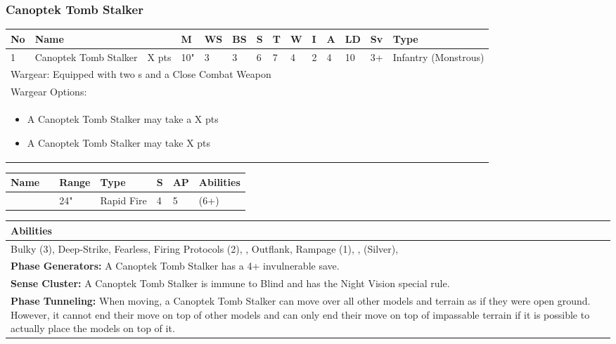 \newpage
\subsubsection{Canoptek Tomb Stalker}

\noindent
\begin{tabular}{||m{10pt} m{115pt} m{30pt} m{11pt} m{11pt} m{11pt} m{11pt} m{11pt} m{11pt} m{11pt} m{11pt} m{11pt} m{11pt} m{105pt}||}
	\hline
	No & Name & & M & WS & BS & S & T & W & I & A & LD & Sv & Type \\
	\hline
	1 & Canoptek Tomb Stalker & X pts & 10" & 3 & 3 & 6 & 7 & 4 & 2 & 4 & 10 & 3+ & Infantry (Monstrous)\\
	\hline
	\hline
	\multicolumn{14}{||Z{532 pt}||}{Wargear: Equipped with two \quickref{Gauss Flayer}s and a Close Combat Weapon}\\
	\multicolumn{14}{||Z{532 pt}||}{Wargear Options:} \\	\multicolumn{14}{||Z{532 pt}||}{\begin{itemize}
			\item A Canoptek Tomb Stalker may take a \quickref{Gloom Prism} \hrulefill X pts
			\item A Canoptek Tomb Stalker may take \quickref{Sepulchral Scarabs} \hrulefill X pts
	\end{itemize}} \\
	\hline
\end{tabular}

\noindent
\begin{tabular}{||m{110pt} m{30pt} m{31pt} m{55pt} m{12pt} m{12pt} m{210pt}||}
	\hline
	Name & & Range & Type & S & AP & Abilities \\
	\hline
	\quickref{Gauss Flayer} & & 24" & Rapid Fire & 4 & 5 & \quickref{Gauss} (6+) \\
	\hline
\end{tabular}

\noindent
\begin{tabular}{||m{532pt}||}
	\hline
	Abilities \\
	\hline
	Bulky (3), Deep-Strike, Fearless, Firing Protocols (2), \quickref{Living Metal}, Outflank, Rampage (1), \quickref{Reanimation Protocols}, \quickref{Soulless Hordes} (Silver), \quickref{Tomb Guardians} \\
	\textbf{Phase Generators:} A Canoptek Tomb Stalker has a 4+ invulnerable save. \\
	\textbf{Sense Cluster:} A Canoptek Tomb Stalker is immune to Blind and has the Night Vision special rule. \\
	\textbf{Phase Tunneling:} When moving, a Canoptek Tomb Stalker can move over all other models and terrain as if they were open ground. However, it cannot end their move on top of other models and can only end their move on top of impassable terrain if it is possible to actually place the models on top of it. \\
	\hline
\end{tabular}




